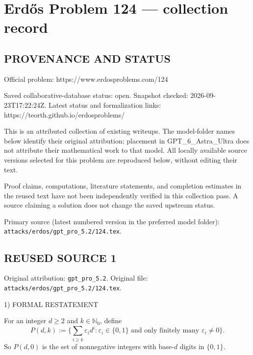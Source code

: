 \section*{Erd\H{o}s Problem 124 --- collection record}

\subsection*{PROVENANCE AND STATUS}
Official problem: https://www.erdosproblems.com/124

Saved collaborative-database status: open.
Snapshot checked: 2026-09-23T17:22:24Z.
Latest status and formalization links: https://teorth.github.io/erdosproblems/

This is an attributed collection of existing writeups. The model-folder names below identify their original attribution; placement in GPT\_6\_Astra\_Ultra does not attribute their mathematical work to that model. All locally available source versions selected for this problem are reproduced below, without editing their text.

Proof claims, computations, literature statements, and completion estimates in the reused text have not been independently verified in this collection pass. A source claiming a solution does not change the saved upstream status.

Primary source (latest numbered version in the preferred model folder): \texttt{attacks/erdos/gpt\_pro\_5.2/124.tex}.

\subsection*{REUSED SOURCE 1}
Original attribution: \texttt{gpt\_pro\_5.2}.
Original file: \texttt{attacks/erdos/gpt\_pro\_5.2/124.tex}.


1) FORMAL RESTATEMENT

For an integer $d\ge 2$ and $k\in\mathbb{N}_0$, define
\[
P(d,k) := \Big\{\sum_{i\ge k} \varepsilon_i d^i : \varepsilon_i\in\{0,1\}\text{ and only finitely many }\varepsilon_i\neq 0\Big\}.
\]
So $P(d,0)$ is the set of nonnegative integers with base-$d$ digits in $\{0,1\}$.

